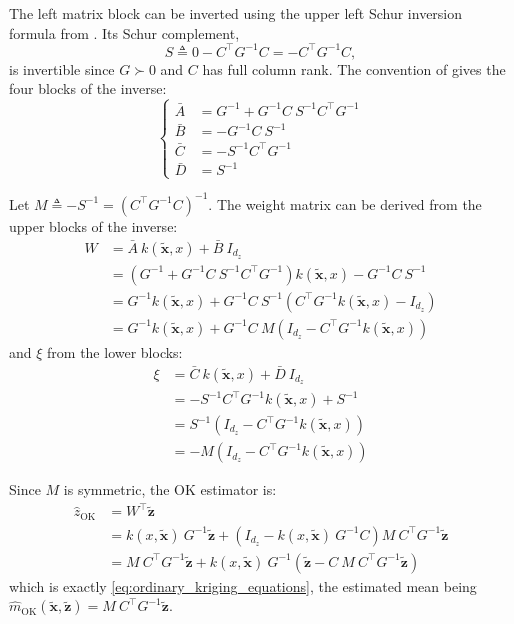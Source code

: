 The left matrix block can be inverted using the upper left Schur inversion formula from . Its Schur complement,
\begin{equation}
	S\triangleq0-C^\top G^{-1}C=-C^\top G^{-1}C,
\end{equation}
is invertible since $G\succ0$ and $C$ has full column rank. The convention of  gives the four blocks of the inverse:
\begin{equation}
	\left\{\begin{aligned}
	\bar{A}&=G^{-1}+G^{-1}C\:S^{-1}C^\top G^{-1}\\
	\bar{B}&=-G^{-1}C\:S^{-1}\\
	\bar{C}&=-S^{-1}C^\top G^{-1}\\
	\bar{D}&=S^{-1}
	\end{aligned}\right.
\end{equation}

Let $M\triangleq-S^{-1}=\left(C^\top G^{-1}C\right)^{-1}$. The weight matrix can be derived from the upper blocks of the inverse:
\begin{equation}
	\begin{aligned}
	W&=\bar{A}\:k(\tilde{\mathbf{x}},x)+\bar{B}\:I_{d_z}\\
	&=\left(G^{-1}+G^{-1}C\:S^{-1}C^\top G^{-1}\right)k(\tilde{\mathbf{x}},x)-G^{-1}C\:S^{-1}\\
	&=G^{-1}k(\tilde{\mathbf{x}},x)+G^{-1}C\:S^{-1}\left(C^\top G^{-1}k(\tilde{\mathbf{x}},x)-I_{d_z}\right)\\
	&=G^{-1}k(\tilde{\mathbf{x}},x)+G^{-1}C\:M\left(I_{d_z}-C^\top G^{-1}k(\tilde{\mathbf{x}},x)\right)
	\end{aligned}
\end{equation}
and $\xi$ from the lower blocks:
\begin{equation}
	\begin{aligned}
	\xi&=\bar{C}\:k(\tilde{\mathbf{x}},x)+\bar{D}\:I_{d_z}\\
	&=-S^{-1}C^\top G^{-1}k(\tilde{\mathbf{x}},x)+S^{-1}\\
	&=S^{-1}\left(I_{d_z}-C^\top G^{-1}k(\tilde{\mathbf{x}},x)\right)\\
	&=-M\left(I_{d_z}-C^\top G^{-1}k(\tilde{\mathbf{x}},x)\right)
	\end{aligned}
\end{equation}

Since $M$ is symmetric, the OK estimator is:
\begin{equation}
	\begin{aligned}
	\hat{z}_{\mathrm{OK}}&=W^\top\tilde{\mathbf{z}}\\
	&=k(x,\tilde{\mathbf{x}})\:G^{-1}\tilde{\mathbf{z}}+\left(I_{d_z}-k(x,\tilde{\mathbf{x}})\:G^{-1}C\right)M\:C^\top G^{-1}\tilde{\mathbf{z}}\\
	&=M\:C^\top G^{-1}\tilde{\mathbf{z}}+k(x,\tilde{\mathbf{x}})\:G^{-1}\left(\tilde{\mathbf{z}}-C\:M\:C^\top G^{-1}\tilde{\mathbf{z}}\right)
	\end{aligned}
\end{equation}
which is exactly \eqref{eq:ordinary_kriging_equations}, the estimated mean being $\hat{m}_{\mathrm{OK}}(\tilde{\mathbf{x}},\tilde{\mathbf{z}})=M\:C^\top G^{-1}\tilde{\mathbf{z}}$.

